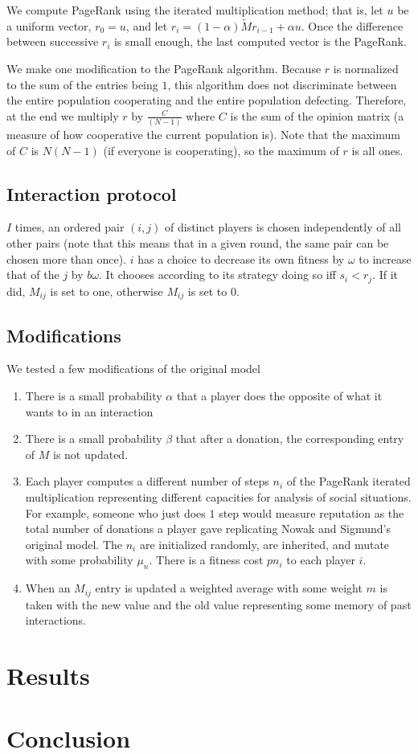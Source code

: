\documentclass{amsart}
\begin{document}
We compute PageRank using the iterated multiplication method; that is, let $u$ be a uniform vector, $r_0 = u$, and let $r_i = (1-\alpha)\tilde M r_{i-1} + \alpha u$. Once the difference between successive $r_i$ is small enough, the last computed vector is the PageRank.

We make one modification to the PageRank algorithm. Because $r$ is normalized to the sum of the entries being $1$, this algorithm does not discriminate between the entire population cooperating and the entire population defecting. Therefore, at the end we multiply $r$ by $\frac{C}{(N-1)}$ where $C$ is the sum of the opinion matrix (a measure of how cooperative the current population is). Note that the maximum of $C$ is $N(N-1)$ (if everyone is cooperating), so the maximum of $r$ is all ones.

\subsection{Interaction protocol}
$I$ times, an ordered pair $(i,j)$ of distinct players is chosen independently of all other pairs (note that this means that in a given round, the same pair can be chosen more than once). $i$ has a choice to decrease its own fitness by $\omega$ to increase that of the $j$ by $b \omega$. It chooses according to its strategy doing so iff $s_i < r_j$. If it did, $M_{ij}$ is set to one, otherwise $M_{ij}$ is set to $0$. 

\subsection{Modifications}
We tested a few modifications of the original model
\begin{enumerate}
\item
There is a small probability $\alpha$ that a player does the opposite of what it wants to in an interaction
\item
There is a small probability $\beta$ that after a donation, the corresponding entry of $M$ is not updated.
\item
Each player computes a different number of steps $n_i$ of the PageRank iterated multiplication representing different capacities for analysis of social situations. For example, someone who just does $1$ step would measure reputation as the total number of donations a player gave replicating Nowak and Sigmund's original model. The $n_i$ are initialized randomly, are inherited, and mutate with some probability $\mu_n$. There is a fitness cost $p n_i$ to each player $i$.
\item
When an $M_{ij}$ entry is updated a weighted average with some weight $m$ is taken with the new value and the old value representing some memory of past interactions.
\end{enumerate}

\section{Results}
\label{sec:results}

\section{Conclusion}
\label{sec:conclusion}



\end{document}
